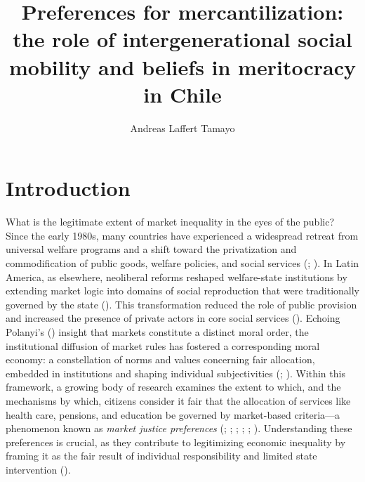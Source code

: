\documentclass[
  13pt,
]{article}
\title{Preferences for mercantilization: the role of intergenerational
social mobility and beliefs in meritocracy in Chile}
\author{Andreas Laffert Tamayo}
\affil{%
                  Instituto de Sociología, Pontificia Universidad
                  Católica de Chile
              }
\date{}
\begin{document}
\maketitle

\section{Introduction}\label{introduction}

What is the legitimate extent of market inequality in the eyes of the
public? Since the early 1980s, many countries have experienced a
widespread retreat from universal welfare programs and a shift toward
the privatization and commodification of public goods, welfare policies,
and social services (; ). In Latin
America, as elsewhere, neoliberal reforms reshaped welfare-state
institutions by extending market logic into domains of social
reproduction that were traditionally governed by the state
(). This transformation
reduced the role of public provision and increased the presence of
private actors in core social services
(). Echoing Polanyi's
() insight that markets
constitute a distinct moral order, the institutional diffusion of market
rules has fostered a corresponding moral economy: a constellation of
norms and values concerning fair allocation, embedded in institutions
and shaping individual subjectivities
(;
). Within
this framework, a growing body of research examines the extent to which,
and the mechanisms by which, citizens consider it fair that the
allocation of services like health care, pensions, and education be
governed by market-based criteria---a phenomenon known as \emph{market
justice preferences} (; ; ;
;
;
).
Understanding these preferences is crucial, as they contribute to
legitimizing economic inequality by framing it as the fair result of
individual responsibility and limited state intervention
().
\end{document}
